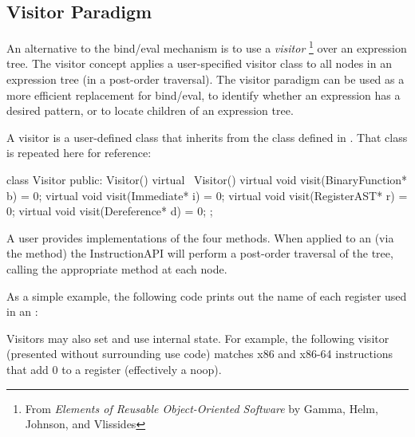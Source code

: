 \subsection{Visitor Paradigm}\label{sec:visitor}

An alternative to the bind/eval mechanism is to use a \emph{visitor}
\footnote{From \emph{Elements of Reusable Object-Oriented Software} by
  Gamma, Helm, Johnson, and Vlissides}
over an expression tree. The visitor concept applies a user-specified
visitor class to all nodes in an expression tree (in a post-order
traversal). The visitor paradigm can be used as a more efficient
replacement for bind/eval, to identify whether an expression has a
desired pattern, or to locate children of an expression tree. 

A visitor is a user-defined class that inherits from the
 class defined in . That class is
repeated here for reference:

\begin{apient}
class Visitor {
  public:
    Visitor() {}
    virtual ~Visitor() {}
    virtual void visit(BinaryFunction* b) = 0;
    virtual void visit(Immediate* i) = 0;
    virtual void visit(RegisterAST* r) = 0;
    virtual void visit(Dereference* d) = 0;
};
\end{apient}

A user provides implementations of the four  methods. When
applied to an  (via the 
method) the InstructionAPI will perform a post-order traversal of the
tree, calling the appropriate  method at each node. 

As a simple example, the following code prints out the name of each
register used in an :

\lstset{language=[GNU]C++,basicstyle=\ttfamily\selectfont\small}
\lstset{numbers=none}


Visitors may also set and use internal state. For example, the
following visitor (presented without surrounding use code) matches x86
and x86-64 instructions that add 0 to a register (effectively a
noop). 


